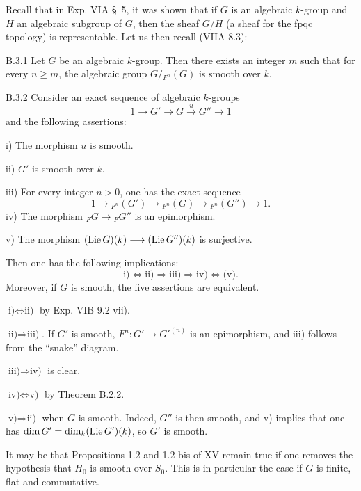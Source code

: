 Recall that in Exp. VIA \S\ 5, it was shown that if $G$ is an algebraic $k$-group and $H$ an algebraic subgroup of $G$, then the sheaf $G/H$ (a sheaf for the fpqc topology) is representable. Let us then recall (VIIA 8.3):
\begin{proposition}{B.3.1}\label{XVII.B.3.1}
Let $G$ be an algebraic $k$-group. Then there exists an integer $m$ such that for every $n\geq m$, the algebraic group $G/{}_{F^n}(G)$ is smooth over $k$.
\end{proposition}
\begin{proposition}{B.3.2}\label{XVII.B.3.2}
Consider an exact sequence of algebraic $k$-groups
\[
1\longrightarrow G'\longrightarrow G\xrightarrow{u}G''\longrightarrow1
\]
and the following assertions:

\noindent i) The morphism $u$ is smooth.

\noindent ii) $G'$ is smooth over $k$.

\noindent iii) For every integer $n>0$, one has the exact sequence
\[
1\longrightarrow {}_{F^n}(G')\longrightarrow {}_{F^n}(G)\longrightarrow {}_{F^n}(G'')\longrightarrow1.
\]
\noindent iv) The morphism ${}_{F}G\to {}_{F}G''$ is an epimorphism.

\noindent v) The morphism $(\operatorname{Lie} G)(k)\longrightarrow(\operatorname{Lie} G'')(k)$ is surjective.

Then one has the following implications:
\[
\text{i)}\Longleftrightarrow\text{ii)}\Longrightarrow\text{iii)}\Longrightarrow\text{iv)}\Longleftrightarrow\text{(v)}.
\]
Moreover, if $G$ is smooth, the five assertions are equivalent.
\end{proposition}
$\text{i)}\Leftrightarrow\text{ii)}$ by Exp. VIB 9.2 vii).

$\text{ii)}\Rightarrow\text{iii)}$. If $G'$ is smooth, $F^n:G'\to G'^{(n)}$ is an epimorphism, and iii) follows from the ``snake'' diagram.

$\text{iii)}\Rightarrow\text{iv)}$ is clear.

$\text{iv)}\Leftrightarrow\text{v)}$ by Theorem B.2.2.

$\text{v)}\Rightarrow\text{ii)}$ when $G$ is smooth. Indeed, $G''$ is then smooth, and v) implies that one has $\dim G'=\dim_k(\operatorname{Lie} G')(k)$, so $G'$ is smooth.

\label{XVII.C.1}
It may be that Propositions 1.2 and 1.2 bis of XV remain true if one removes the hypothesis that $H_0$ is smooth over $S_0$. This is in particular the case if $G$ is finite, flat and commutative.
